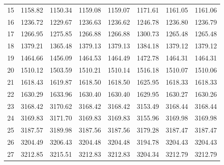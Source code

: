 \documentclass[10pt,oneside]{article}
\begin{document}
\begin{table}[h!]
\begin{tabular}{cccccccc}
15 &   1158.82 & 1150.34 & 1159.08 &    1159.07 &      1171.61 & 1161.05 &   1161.06 \\
16 &   1236.72 & 1229.67 & 1236.63 &    1236.62 &      1246.78 & 1236.80 &   1236.79 \\
17 &   1266.95 & 1275.85 & 1266.88 &    1266.88 &      1300.73 & 1265.48 &   1265.48 \\
18 &   1379.21 & 1365.48 & 1379.13 &    1379.13 &      1384.18 & 1379.12 &   1379.12 \\
19 &   1464.66 & 1456.09 & 1464.53 &    1464.49 &      1472.78 & 1464.31 &   1464.31 \\
20 &   1510.12 & 1503.59 & 1510.21 &    1510.14 &      1516.18 & 1510.07 &   1510.06 \\
21 &   1618.43 & 1619.87 & 1618.50 &    1618.50 &      1625.95 & 1618.33 &   1618.33 \\
22 &   1630.29 & 1633.96 & 1630.40 &    1630.40 &      1629.95 & 1630.27 &   1630.26 \\
23 &   3168.42 & 3170.62 & 3168.42 &    3168.42 &      3153.49 & 3168.44 &   3168.44 \\
24 &   3169.83 & 3171.70 & 3169.83 &    3169.83 &      3155.96 & 3169.98 &   3169.98 \\
25 &   3187.57 & 3189.98 & 3187.56 &    3187.56 &      3179.28 & 3187.47 &   3187.47 \\
26 &   3204.49 & 3206.43 & 3204.48 &    3204.48 &      3194.78 & 3204.43 &   3204.43 \\
27 &   3212.85 & 3215.51 & 3212.83 &    3212.83 &      3204.34 & 3212.79 &   3212.79 \\
\bottomrule
\end{tabular}
\end{table}
\end{document}
